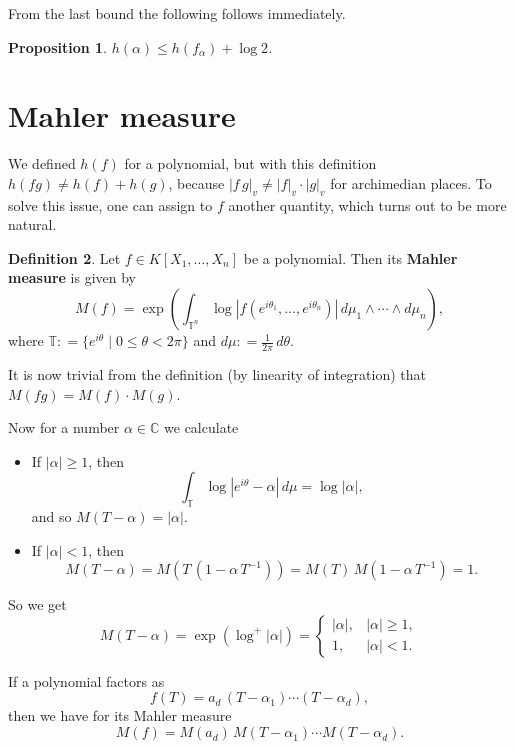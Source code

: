 \documentclass{article}
\newtheorem{proposition}{Proposition}[section]
\theoremstyle{definition}
\newtheorem{definition}[proposition]{Definition}
\newcommand{\term}{\textbf}
\newcommand{\dfn}{\mathrel{\mathop:}=}
\newcommand{\CC}{\mathbb{C}}
\begin{document}
From the last bound the following follows immediately.

\begin{proposition}
  $h (\alpha) \le h (f_\alpha) + \log 2$.
\end{proposition}

\section{Mahler measure}

We defined $h (f)$ for a polynomial, but with this definition
$h (fg) \ne h(f) + h(g)$, because $|f\,g|_v \ne |f|_v \cdot |g|_v$ for
archimedian places. To solve this issue, one can assign to $f$ another quantity,
which turns out to be more natural.

\begin{definition}
  Let $f \in K [X_1,\ldots,X_n]$ be a polynomial. Then its \term{Mahler measure}
  is given by
  $$M (f) = \exp \left( \int_{\mathbb{T}^n} \log |f (e^{i\theta_1}, \ldots, e^{i\theta_n})|\,d\mu_1\wedge\cdots\wedge d\mu_n \right),$$
  where $\mathbb{T} \dfn \{ e^{i\theta} \mid 0 \le \theta < 2\pi \}$ and $d\mu \dfn \frac{1}{2\pi} \, d\theta$.
\end{definition}

It is now trivial from the definition (by linearity of integration) that
$M (fg) = M (f) \cdot M (g)$.

Now for a number $\alpha \in \CC$ we calculate

\begin{itemize}
\item If $|\alpha| \ge 1$, then
  $$\int_\mathbb{T} \log |e^{i\theta} - \alpha|\,d\mu = \log |\alpha|,$$
  and so $M (T - \alpha) = |\alpha|$.

\item If $|\alpha| < 1$, then
  $$M (T - \alpha) = M (T \, (1-\alpha\,T^{-1})) = M (T) \, M (1 - \alpha\,T^{-1}) = 1.$$
\end{itemize}

So we get
\begin{equation}
  \label{eqn:mahler-logplus}M (T - \alpha) = \exp (\log^+ |\alpha|) =
  \left\{\begin{array}{ll}
           |\alpha|, & |\alpha| \ge 1,\\
           1, & |\alpha| < 1.
         \end{array}\right.
\end{equation}

If a polynomial factors as
$$f (T) = a_d\,(T-\alpha_1) \cdots (T-\alpha_d),$$
then we have for its Mahler measure
$$M (f) = M (a_d) \, M (T - \alpha_1) \cdots M (T - \alpha_d).$$
\end{document}
